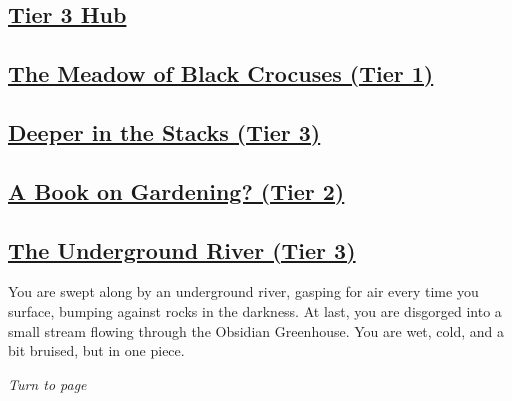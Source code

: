 \documentclass[sheet]{GL2020}
\begin{document}
\clearpage



\begin{center}\section*{\underline{Tier 3 Hub}}\end{center}
\label{TierThreeHub}

\clearpage

\begin{center}\section*{\underline{The Meadow of Black Crocuses (Tier 1)}}\end{center}
\label{MeadowofBlackCrocuses}

\clearpage

\begin{center}\section*{\underline{Deeper in the Stacks (Tier 3)}}\end{center}
\label{DeeperStacks}

\clearpage

\begin{center}\section*{\underline{A Book on Gardening? (Tier 2)}}\end{center}
\label{BookonGardening}

\clearpage

\begin{center}\section*{\underline{The Underground River (Tier 3)}}\end{center}
\label{UndergroundRiver}

You are swept along by an underground river, gasping for air every time you surface, bumping against rocks in the darkness. At last, you are disgorged into a small stream flowing through the Obsidian Greenhouse. You are wet, cold, and a bit bruised, but in one piece.

\emph{Turn to page \pageref{ObsidianGreenhouse}}
\end{document}
